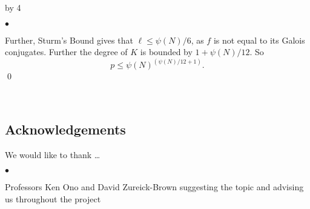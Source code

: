 \documentclass[12pt]{scrartcl}
\newenvironment{citemize}{
\begin{list}{$\bullet$}{\setlength{\itemsep}{0pt} \setlength{\rightmargin}{0pt} \setlength{\leftmargin}{0.5\labelwidth} \setlength{\topsep}{0pt}}
}{\end{list}}
\def\anzspalten{4}
\newlength{\kastenwidth}
\newenvironment{kasten}{%
  \begin{lrbox}{\dummybox}%
    \begin{minipage}{0.96\linewidth}}%
    {\end{minipage}%
  \end{lrbox}%
  \raisebox{-\depth}{\psshadowbox[framesep=1em]{\usebox{\dummybox}}}\\[0.5em]}
\newenvironment{spalte}{%
  \setlength\kastenwidth{1.2\textwidth}
  \divide\kastenwidth by \anzspalten
  \begin{minipage}[t]{\kastenwidth}}{\end{minipage}\hfill}
\begin{document}
\begin{lrbox}{\spalten}
{\begin{spalte}
\begin{kasten}
\begin{citemize}
\item Further, Sturm's Bound gives that $\ell \leq \psi(N)/6$, as $f$ is not equal to its Galois conjugates.  Further the degree of $K$ is bounded by $1+\psi(N)/12$.  So
\[p \leq \psi(N)^{(\psi(N)/12+1)}.\]
\qed
\end{citemize}

\end{kasten}












\begin{kasten}
\subsection*{{\color{blue} Acknowledgements}}
We would like to thank \ldots
\begin{citemize}
\item Professors Ken Ono and David Zureick-Brown suggesting the topic and advising us throughout the project


\end{citemize}
\end{kasten}
\end{spalte}}
\end{lrbox}
\end{document}
